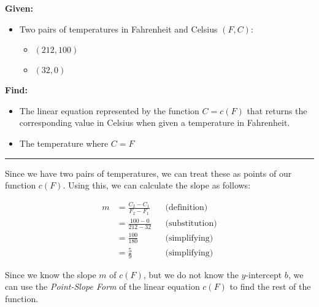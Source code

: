 \begin{homework}
    \newpage
    \date{May 19, 2022}

    \begin{exercise}
        \textbf{Given:}
        \begin{itemize}
            \item Two pairs of temperatures in Fahrenheit and Celsius $ (F, C) $:
            \begin{itemize}
                \item $ (212, 100) $
                \item $ (32, 0) $
            \end{itemize}
        \end{itemize}

        \textbf{Find:}
        \begin{itemize}
            \item The linear equation represented by the function $ C = c(F) $
            that returns the corresponding value in Celsius when given a temperature in Fahrenheit.
            \item The temperature where $ C = F $
        \end{itemize}
    \end{exercise}
    \rule{\textwidth}{0.4pt}

    \begin{solution}
        
        Since we have two pairs of temperatures, we can treat these as points of our function $ c(F) $.
        Using this, we can calculate the slope as follows:

        \begin{align*}
            m &= \frac{C_2 - C_1}{F_2 - F_1}
                &&\text{(definition)}\\
              &= \frac{100-0}{212-32}
                &&\text{(substitution)}\\
              &= \frac{100}{180}
                &&\text{(simplifying)}\\
            &= \frac{5}{9}
                &&\text{(simplifying)}
        \end{align*}
        
        Since we know the slope $m$ of $c(F)$, but we do not know the $y$-intercept $b$,
        we can use the \textit{Point-Slope Form} of the linear equation $c(F)$ to find the rest of the function.
        

\end{solution}
\end{homework}
